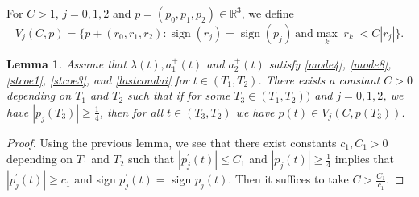 \documentclass[a4paper,two-side,10pt]{amsart}
\newtheorem{lem}{Lemma}[section]
\newcommand{\R}{\mathbb{R}}
\numberwithin{equation}{section}
\DeclareMathOperator{\sign}{sign}
\begin{document}
For $C>1$, $j=0,1,2$ and $p=(p_0,p_1,p_2)\in \R^3$, we define
$$V_j (C,p)=\{p+(r_0 ,r_1,r_2): \sign (r_j)= \sign(p_j)\ \text{and} \max_k |r_k|<C|r_j|\}.$$


\begin{lem}\label{4-10}
Assume that $\lambda (t) , a_1^+ (t)$ and $a_2^+ (t)$ satisfy \eqref{mode4}, \eqref{mode8}, \eqref{stcoe1}, \eqref{stcoe3}, and \eqref{lastcondai} for $t\in (T_1 ,T_2)$. There exists a constant $C>0$ depending on $T_1$ and $T_2$ such that if for some $T_3 \in (T_1 ,T_2))$ and $j=0,1,2$, we have $|p_j (T_3)| \geq \frac{1}{4}$, then for all $t\in (T_3,T_2)$ we have $p(t) \in V_j (C, p(T_3))$.
\end{lem}

\begin{proof}
Using the previous lemma, we see that there exist constants $c_1,C_1>0$ depending on $T_1$ and $T_2$ such that $|p_j^\prime (t)|\leq C_1$ and $|p_j (t)|\geq \frac{1}{4}$ implies that $|p_j^\prime (t)|\geq c_1$ and sign $p_j^\prime (t)=$ sign $p_j (t)$. Then it suffices to take $C>\frac{C_1}{c_1}$. 
\end{proof}
\end{document}
